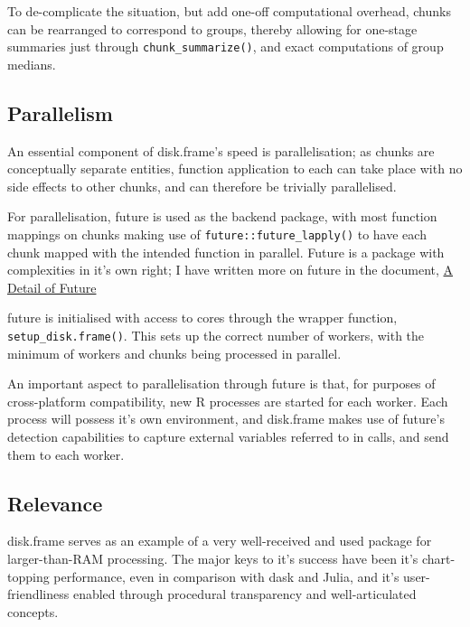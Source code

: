 \documentclass[a4paper,10pt]{article}
\begin{document}
To de-complicate the situation, but add one-off computational
overhead, chunks can be rearranged to correspond to groups, thereby
allowing for one-stage summaries just through
\texttt{chunk\_summarize()}, and exact computations of group medians.

\subsection{Parallelism}
\label{sec:parallelisation}

An essential component of disk.frame's speed is parallelisation; as
chunks are conceptually separate entities, function application to
each can take place with no side effects to other chunks, and can
therefore be trivially parallelised.

For parallelisation, future is used as the backend package, with most
function mappings on chunks making use of
\texttt{future::future\_lapply()} to have each chunk mapped with the
intended function in parallel. Future is a package with complexities
in it's own right; I have written more on future in the document,
\href{detail-future.pdf}{A Detail of Future}

future is initialised with access to cores through the wrapper
function, \texttt{setup\_disk.frame()}\cite{zj19:_key}. This sets up
the correct number of workers, with the minimum of workers and chunks
being processed in parallel.

An important aspect to parallelisation through future is that, for
purposes of cross-platform compatibility, new R processes are started
for each worker\cite{zj19:_using}. Each process will possess it's own
environment, and disk.frame makes use of future's detection
capabilities to capture external variables referred to in calls, and
send them to each worker.

\subsection{Relevance}
\label{sec:relevance}

disk.frame serves as an example of a very well-received and used
package for larger-than-RAM processing. The major keys to it's success
have been it's chart-topping performance, even in comparison with dask
and Julia, and it's user-friendliness enabled through procedural
transparency and well-articulated concepts.
\end{document}
